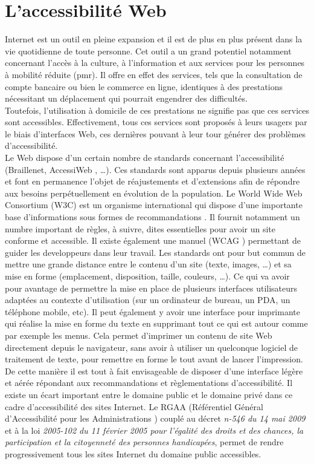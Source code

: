 \documentclass[french,a4paper]{report}
\begin{document}
\section{L'accessibilité Web}
Internet est un outil en pleine expansion et il est de plus en plus présent dans la vie quotidienne
de toute personne. Cet outil a un grand potentiel notamment concernant l'accès à la culture, à
l'information et aux services pour les personnes à mobilité réduite (\gls{pmr}). Il offre en
effet des services, tels que la consultation de compte bancaire ou bien le
commerce en ligne, identiques
à des prestations nécessitant un déplacement qui pourrait engendrer des difficultés.\\
Toutefois, l'utilisation à domicile
de ces prestations ne signifie pas que ces services sont accessibles.
Effectivement, tous ces services sont proposés à leurs usagers par le biais d'interfaces Web, ces
dernières pouvant à leur tour générer des problèmes d'accessibilité.\\
Le Web dispose d'un certain nombre de standards concernant l'accessibilité (Braillenet,
AccessiWeb \cite{AccessiWeb}, \dots). Ces standards sont apparus depuis plusieurs années et
font en permanence l'objet de réajustements et d'extensions afin de répondre aux besoins
perpétuellement en évolution de la population.
\newline
Le World Wide Web Consortium (W3C) est un organisme international qui dispose
d'une importante
base d'informations sous formes de recommandations
. Il fournit notamment un numbre important de règles, à suivre, dites essentielles
pour avoir un site conforme et accessible. Il existe également une manuel (WCAG
\cite{WCAG2})
permettant de guider les developpeurs dans leur travail.
\newline
Les standards ont pour but commun de mettre une grande distance entre le contenu d'un site (texte,
images, \dots) et sa mise en forme (emplacement, disposition, taille, couleurs, \dots).
Ce qui va avoir pour avantage de permettre la mise en place de plusieurs
interfaces utilisateurs adaptées au contexte d'utilisation (sur un ordinateur de bureau, un PDA,
un téléphone mobile, etc). Il peut également y avoir une interface pour imprimante qui réalise
la mise en forme du texte en supprimant tout ce qui est autour comme par exemple les menus.
Cela permet d'imprimer un contenu de site Web directement depuis le navigateur, sans avoir à
utiliser un quelconque logiciel de traitement de texte, pour remettre en forme le tout avant de
lancer l'impression. De cette manière il est tout à fait envisageable de disposer
d'une interface légère et aérée répondant aux recommandations et règlementations d'accessibilité.
\newline
Il existe un écart important entre le domaine public et le domaine privé dans ce cadre
d'accessibilité des sites Internet. Le RGAA (Référentiel Général d'Accessibilité pour les
Administrations \cite{RGAA}) couplé au décret \emph{n-546 du 14 mai 2009} et à la
loi \emph{2005-102 du 11 février 2005 pour l'égalité des droits et des chances, la participation
et la citoyenneté des personnes handicapées}, permet de rendre progressivement tous les sites
Internet du domaine public accessibles.
\end{document}

